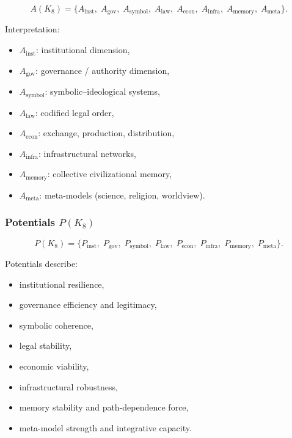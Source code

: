 \[
A(K_8)=
\{
A_{\mathrm{inst}},\;
A_{\mathrm{gov}},\;
A_{\mathrm{symbol}},\;
A_{\mathrm{law}},\;
A_{\mathrm{econ}},\;
A_{\mathrm{infra}},\;
A_{\mathrm{memory}},\;
A_{\mathrm{meta}}
\}.
\]

Interpretation:
\begin{itemize}
    \item $A_{\mathrm{inst}}$: institutional dimension,
    \item $A_{\mathrm{gov}}$: governance / authority dimension,
    \item $A_{\mathrm{symbol}}$: symbolic–ideological systems,
    \item $A_{\mathrm{law}}$: codified legal order,
    \item $A_{\mathrm{econ}}$: exchange, production, distribution,
    \item $A_{\mathrm{infra}}$: infrastructural networks,
    \item $A_{\mathrm{memory}}$: collective civilizational memory,
    \item $A_{\mathrm{meta}}$: meta-models (science, religion, worldview).
\end{itemize}

\subsubsection{Potentials \texorpdfstring{$P(K_8)$}{P(K_8)}}

\[
P(K_8)=
\{
P_{\mathrm{inst}},\;
P_{\mathrm{gov}},\;
P_{\mathrm{symbol}},\;
P_{\mathrm{law}},\;
P_{\mathrm{econ}},\;
P_{\mathrm{infra}},\;
P_{\mathrm{memory}},\;
P_{\mathrm{meta}}
\}.
\]

Potentials describe:
\begin{itemize}
    \item institutional resilience,
    \item governance efficiency and legitimacy,
    \item symbolic coherence,
    \item legal stability,
    \item economic viability,
    \item infrastructural robustness,
    \item memory stability and path-dependence force,
    \item meta-model strength and integrative capacity.
\end{itemize}

